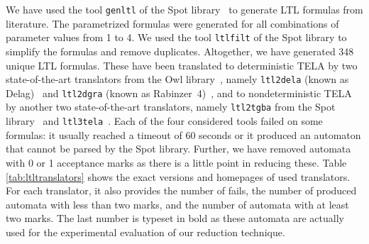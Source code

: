 \documentclass[a4paper,UKenglish,cleveref,autoref,thm-restate]{lipics-v2021}
\newcommand{\todo}[1]{\marginpar{\textcolor{red}{#1}}}
\begin{document}
We have used the tool \texttt{genltl} of the Spot
library~\cite{duret.16.atva2} to generate LTL formulas from
literature. The parametrized formulas were generated for all
combinations of parameter values from 1 to 4. We used the tool
\texttt{ltlfilt} of the Spot library to simplify the formulas and
remove duplicates. Altogether, we have generated 348 unique LTL
formulas. These have been translated to deterministic TELA by two
state-of-the-art translators from the Owl
library~\cite{kretinsky.18.atva}, namely \texttt{ltl2dela} (known as
Delag)~\cite{muller.17.gandalf} and \texttt{ltl2dgra} (known as
Rabinzer~4)~\cite{kretinsky.18.cav}, and to nondeterministic TELA by
another two state-of-the-art translators, namely \texttt{ltl2tgba}
from the Spot library~\cite{duret.16.atva2} and
\texttt{ltl3tela}~\cite{major.19.atva}. Each of the four considered
tools failed on some formulas: it usually reached a timeout of 60
seconds or it produced an automaton that cannot be parsed by the Spot
library.
Further, we have removed automata with 0 or 1 acceptance marks as
there is a little point in reducing these. Table
\ref{tab:ltltranslators} shows the exact versions and homepages of
used translators. For each translator, it also provides the number of
fails, the number of produced automata with less than two marks, and
the number of automata with at least two marks. The last number is
typeset in bold as these automata are actually used for the
experimental evaluation of our reduction technique.
\end{document}
